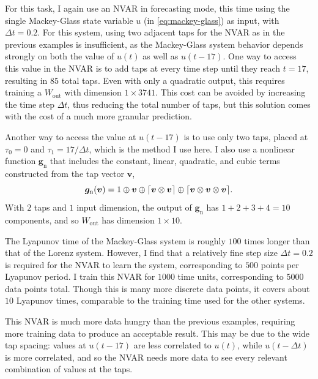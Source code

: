 For this task, I again use an NVAR in forecasting mode, this time
using the single Mackey-Glass state variable $u$ (in
\cref{eq:mackey-glass}) as input, with $\Delta t = 0.2$. For this
system, using two adjacent taps for the NVAR as in the previous
examples is insufficient, as the Mackey-Glass system behavior depends
strongly on both the value of $u(t)$ as well as $u(t - 17)$. One way
to access this value in the NVAR is to add taps at every time step
until they reach $t = 17$, resulting in $85$ total taps. Even with only a
quadratic output, this requires training a $W_\text{out}$ with
dimension $1 \times 3741$. This cost can be avoided by increasing the
time step $\Delta t$, thus reducing the total number of taps, but this
solution comes with the cost of a much more granular prediction.

Another way to access the value at $u(t-17)$ is to use only two taps,
placed at $\tau_0 = 0$ and $\tau_1 = 17 / \Delta t$, which is the
method I use here. I also use a nonlinear function
$\bm{g}_\text{n}$ that includes the constant, linear, quadratic, and
cubic terms constructed from the tap vector $\bm{v}$,
\begin{equation}
  \bm{g}_\text{n}(\bm{v}) = 1 \oplus \bm{v} \oplus \lceil\bm{v} \otimes \bm{v}\rceil \oplus \lceil\bm{v} \otimes \bm{v} \otimes \bm{v}\rceil.
\end{equation}
With $2$ taps and $1$ input dimension, the output of $\bm{g}_\text{n}$
has $1 + 2 + 3 + 4 = 10$ components, and so $W_\text{out}$ has
dimension $1 \times 10$.

The Lyapunov time of the Mackey-Glass system is roughly $100$ times
longer than that of the Lorenz system. However, I find that a
relatively fine step size $\Delta t = 0.2$ is required for the NVAR to
learn the system, corresponding to $500$ points per Lyapunov period. I train this NVAR for $1000$ time units,
corresponding to $5000$ data points total. Though this is many more
discrete data points, it covers about $10$ Lyapunov times, comparable
to the training time used for the other systems.

This NVAR is much more data hungry than the previous examples,
requiring more training data to produce an acceptable result. This may
be due to the wide tap spacing: values at $u(t - 17)$ are less
correlated to $u(t)$, while $u(t - \Delta t)$ is more correlated, and
so the NVAR needs more data to see every relevant combination of
values at the taps.

